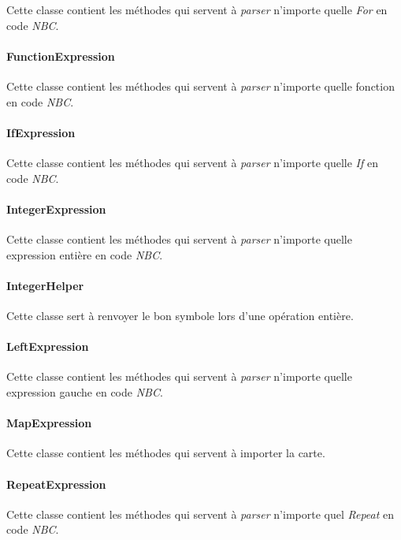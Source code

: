 Cette classe contient les méthodes qui servent à \emph{parser} n'importe quelle \emph{For} en code \emph{NBC}.

\paragraph{FunctionExpression}

Cette classe contient les méthodes qui servent à \emph{parser} n'importe quelle fonction en code \emph{NBC}.

\paragraph{IfExpression}

Cette classe contient les méthodes qui servent à \emph{parser} n'importe quelle \emph{If} en code \emph{NBC}.

\paragraph{IntegerExpression}

Cette classe contient les méthodes qui servent à \emph{parser} n'importe quelle expression entière en code \emph{NBC}.

\paragraph{IntegerHelper}

Cette classe sert à renvoyer le bon symbole lors d'une opération entière.

\paragraph{LeftExpression}

Cette classe contient les méthodes qui servent à \emph{parser} n'importe quelle expression gauche en code \emph{NBC}.

\paragraph{MapExpression}

Cette classe contient les méthodes qui servent à importer la carte.

\paragraph{RepeatExpression}

Cette classe contient les méthodes qui servent à \emph{parser} n'importe quel \emph{Repeat} en code \emph{NBC}.

